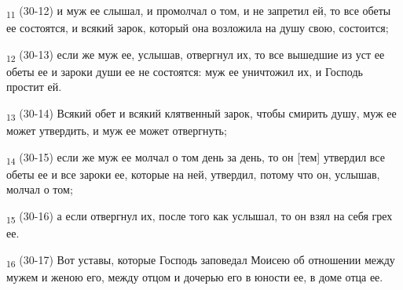 \begin{tcolorbox}
\textsubscript{11} (30-12) и муж ее слышал, и промолчал о том, и не запретил ей, то все обеты ее состоятся, и всякий зарок, который она возложила на душу свою, состоится;
\end{tcolorbox}
\begin{tcolorbox}
\textsubscript{12} (30-13) если же муж ее, услышав, отвергнул их, то все вышедшие из уст ее обеты ее и зароки души ее не состоятся: муж ее уничтожил их, и Господь простит ей.
\end{tcolorbox}
\begin{tcolorbox}
\textsubscript{13} (30-14) Всякий обет и всякий клятвенный зарок, чтобы смирить душу, муж ее может утвердить, и муж ее может отвергнуть;
\end{tcolorbox}
\begin{tcolorbox}
\textsubscript{14} (30-15) если же муж ее молчал о том день за день, то он [тем] утвердил все обеты ее и все зароки ее, которые на ней, утвердил, потому что он, услышав, молчал о том;
\end{tcolorbox}
\begin{tcolorbox}
\textsubscript{15} (30-16) а если отвергнул их, после того как услышал, то он взял на себя грех ее.
\end{tcolorbox}
\begin{tcolorbox}
\textsubscript{16} (30-17) Вот уставы, которые Господь заповедал Моисею об отношении между мужем и женою его, между отцом и дочерью его в юности ее, в доме отца ее.
\end{tcolorbox}
